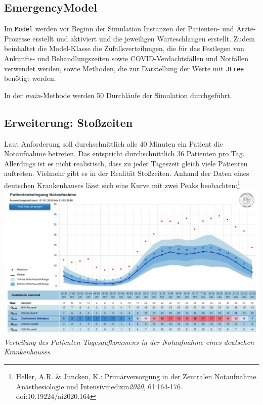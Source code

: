 \documentclass{article}
\begin{document}
\subsection{EmergencyModel}

Im \texttt{Model} werden vor Beginn der Simulation Instanzen der Patienten- und Ärzte-Prozesse erstellt und aktiviert und die jeweiligen Warteschlangen erstellt.
Zudem beinhaltet die Model-Klasse die Zufallsverteilungen, die für das Festlegen von Ankunfts- und Behandlungszeiten sowie COVID-Verdachtsfällen und Notfällen verwendet werden, sowie Methoden, die zur Darstellung der Werte mit \texttt{JFree} benötigt werden.

In der \textit{main}-Methode werden 50 Durchläufe der Simulation durchgeführt.

\subsection{Erweiterung: Stoßzeiten}

Laut Anforderung soll durchschnittlich alle 40 Minuten ein Patient die Notaufnahme betreten.
Das entspricht durchschnittlich 36 Patienten pro Tag.
Allerdings ist es nicht realistisch, dass zu jeder Tageszeit gleich viele Patienten auftreten.
Vielmehr gibt es in der Realität Stoßzeiten.
Anhand der Daten eines deutschen Krankenhauses lässt sich eine Kurve mit zwei Peaks beobachten:\footnote{Heller, A.R. \& Juncken, K.: Primärversorgung in der Zentralen Notaufnahme. Anästhesiologie und Intensivmedizin\textit{2020}, 61:164-176. doi:10.19224/ai2020.164} \\

\includegraphics[width=\textwidth]{img/arrival_times.png}\\
\textit{Verteilung des Patienten-Tagesaufkommens in der Notaufnahme eines deutschen Krankenhauses} \\
\end{document}
